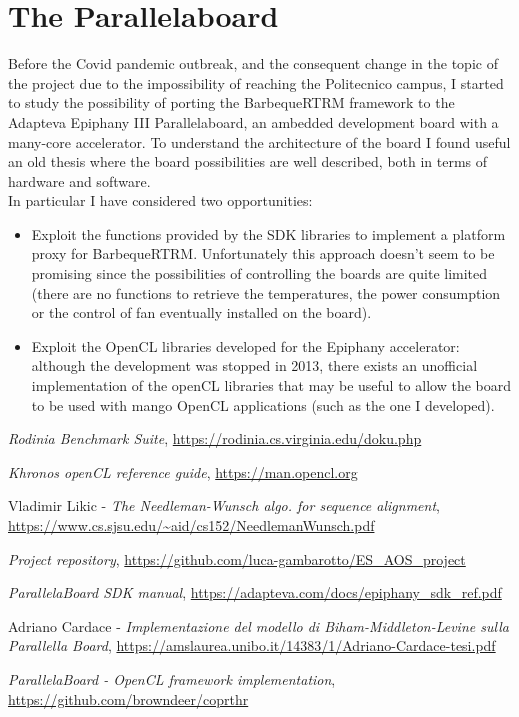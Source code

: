 \section{The Parallelaboard}
Before the Covid pandemic outbreak, and the consequent change in the topic of the project due to the impossibility of reaching the Politecnico campus, I started to study the possibility of porting the BarbequeRTRM framework to the Adapteva Epiphany III Parallelaboard, an ambedded development board with a many-core accelerator. To understand the architecture of the board I found useful an old thesis\cite{pb2} where the board possibilities are well described, both in terms of hardware and software.\\In particular I have considered two opportunities:
\begin{itemize}
      \item Exploit the functions provided by the SDK libraries\cite{pb1} to implement a platform proxy for BarbequeRTRM. Unfortunately this approach doesn't seem to be promising since the possibilities of controlling the boards are quite limited (there are no functions to retrieve the temperatures, the power consumption or the control of fan eventually installed on the board).
      \item Exploit the OpenCL libraries developed for the Epiphany accelerator\cite{pb3}: although the development was stopped in 2013, there exists an unofficial implementation of the openCL libraries that may be useful to allow the board to be used with mango OpenCL applications (such as the one I developed).
\end{itemize}

\begin{thebibliography}{9}

            \textit{Rodinia Benchmark Suite},
            \url{https://rodinia.cs.virginia.edu/doku.php}
      
            \textit{Khronos openCL reference guide},
            \url{https://man.opencl.org}
      
            Vladimir Likic - 
            \textit{The Needleman-Wunsch algo. for sequence alignment},
            \url{https://www.cs.sjsu.edu/~aid/cs152/NeedlemanWunsch.pdf}

            \textit{Project repository},
            \url{https://github.com/luca-gambarotto/ES_AOS_project}

            \textit{ParallelaBoard SDK manual},
            \url{https://adapteva.com/docs/epiphany_sdk_ref.pdf}
            
            Adriano Cardace -
            \textit{Implementazione del modello di Biham-Middleton-Levine sulla Parallella Board},
            \url{https://amslaurea.unibo.it/14383/1/Adriano-Cardace-tesi.pdf}

            \textit{ParallelaBoard - OpenCL framework implementation},
            \url{https://github.com/browndeer/coprthr}

            

\end{thebibliography}

